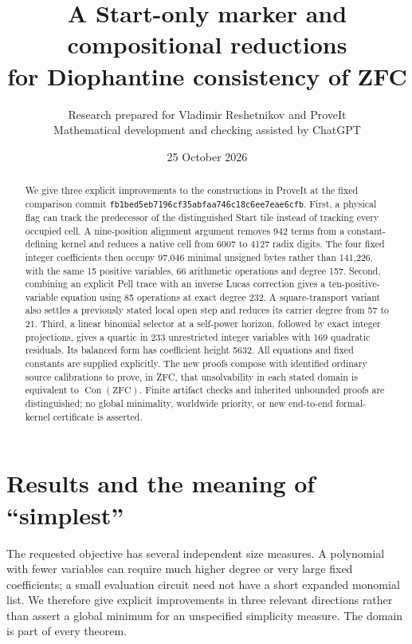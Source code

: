 \documentclass[10pt,letterpaper]{article}
\title{A Start-only marker and compositional reductions\\for Diophantine consistency of ZFC}
\author{Research prepared for Vladimir Reshetnikov and ProveIt\\\small Mathematical development and checking assisted by ChatGPT}
\date{25 October 2026}
\newcommand{\Con}{\operatorname{Con}}
\theoremstyle{remark}\newtheorem{remark}[theorem]{Remark}
\begin{document}
\maketitle
\begin{abstract}
We give three explicit improvements to the constructions in ProveIt at the
fixed comparison commit \texttt{fb1bed5eb7196cf35abfaa746c18c6ee7eae6cfb}.
First, a physical flag can track the predecessor of the distinguished Start
tile instead of tracking every occupied cell. A nine-position alignment
argument removes 942 terms from a constant-defining kernel and reduces a
native cell from 6007 to 4127 radix digits. The four fixed integer
coefficients then occupy 97,046 minimal unsigned bytes rather than 141,226,
with the same 15 positive variables, 66 arithmetic operations and degree 157.
Second, combining an explicit Pell trace with an inverse Lucas correction
gives a ten-positive-variable equation using 85 operations at exact degree
232. A square-transport variant also settles a previously stated local open
step and reduces its carrier degree from 57 to 21.
Third, a linear binomial selector at a self-power horizon, followed by exact
integer projections, gives a quartic in 233 unrestricted integer variables
with 169 quadratic residuals. Its balanced form has coefficient height 5632.
All equations and fixed constants are supplied explicitly. The new proofs
compose with identified ordinary source calibrations to prove, in ZFC, that
unsolvability in each stated domain is equivalent to $\Con(\mathrm{ZFC})$.
Finite artifact checks and inherited unbounded proofs are distinguished;
no global minimality, worldwide priority, or new end-to-end formal-kernel
certificate is asserted.
\end{abstract}
\setcounter{tocdepth}{1}
\tableofcontents
\clearpage

\section{Results and the meaning of ``simplest''}

The requested objective has several independent size measures. A polynomial
with fewer variables can require much higher degree or very large fixed
coefficients; a small evaluation circuit need not have a short expanded
monomial list. We therefore give explicit improvements in three relevant
directions rather than assert a global minimum for an unspecified simplicity measure.
The domain is part of every theorem.
\end{document}
